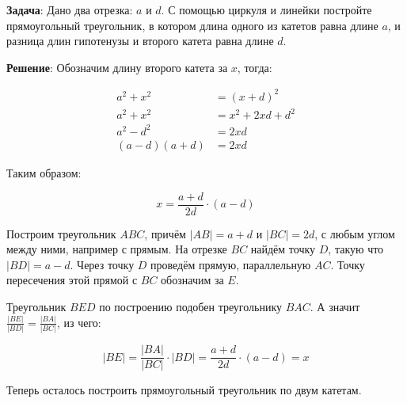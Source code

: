 \documentclass{article} %
\begin{document}
\textbf{Задача}: Дано два отрезка: $a$ и $d$. С помощью циркуля и линейки постройте прямоугольный треугольник, в котором длина одного из катетов равна длине $a$, и разница длин гипотенузы и второго катета равна длине $d$.

\clearpage

\textbf{Решение}: Обозначим длину второго катета за $x$, тогда:

\begin{align*}
  a^2 + x^2 &= (x+d)^2 \\
  a^2 + x^2 &= x^2 + 2xd + d^2 \\
  a^2 - d^2 &= 2xd \\
  (a - d) (a + d) &= 2xd
\end{align*}

Таким образом:

\begin{equation}
  x = \frac{a + d}{2d} \cdot (a - d) 
\end{equation}

Построим треугольник $ABC$, причём $|AB| = a + d$ и $|BC| = 2d$, с любым углом между ними, например с прямым.
На отрезке $BC$ найдём точку $D$, такую что $|BD| = a - d$.
Через точку $D$ проведём прямую, параллельную $AC$. Точку пересечения этой прямой с $BC$ обозначим за $E$.

\begin{center}
\end{center}

Треугольник $BED$ по построению подобен треугольнику $BAC$. А значит $\frac{|BE|}{|BD|} = \frac{|BA|}{|BC|}$, из чего:

\begin{equation}
  |BE| = \frac{|BA|}{|BC|} \cdot |BD| = \frac{a + d}{2d} \cdot (a - d) = x
\end{equation}

Теперь осталось построить прямоугольный треугольник по двум катетам.
\end{document}
